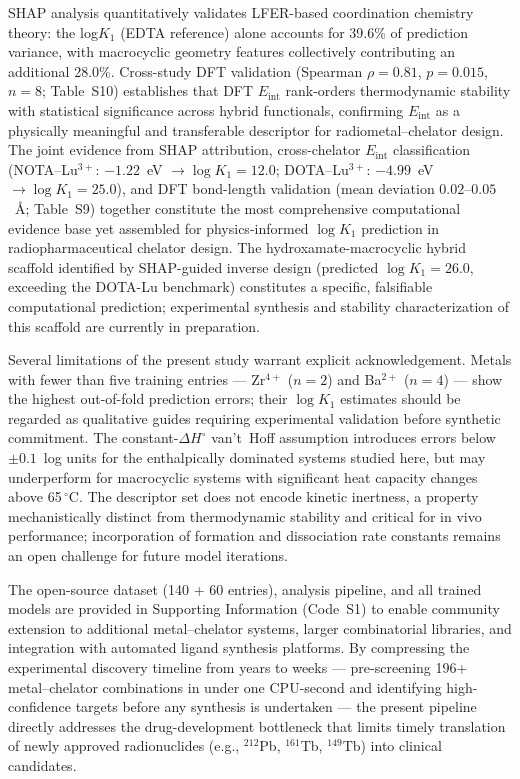 \documentclass[journal=jacsat,manuscript=article]{achemso}
\begin{document}
SHAP analysis quantitatively validates LFER-based coordination chemistry
theory:\cite{Hancock1989,MartellSmith2004} the log$K_1$ (EDTA reference) alone
accounts for 39.6\% of prediction variance, with macrocyclic geometry features
collectively contributing an additional 28.0\%.
Cross-study DFT validation (Spearman $\rho = 0.81$, $p = 0.015$, $n = 8$;
Table~S10)\cite{Kim2026molpharm} establishes that DFT $E_\mathrm{int}$
rank-orders thermodynamic stability with statistical significance across hybrid
functionals, confirming $E_\mathrm{int}$ as a physically meaningful and
transferable descriptor for radiometal--chelator design.
The joint evidence from SHAP attribution, cross-chelator $E_\mathrm{int}$
classification (NOTA--Lu$^{3+}$: $-1.22$~eV $\to \log K_1 = 12.0$;
DOTA--Lu$^{3+}$: $-4.99$~eV $\to \log K_1 = 25.0$), and DFT bond-length
validation (mean deviation $0.02$--$0.05$~\AA; Table~S9) together constitute the
most comprehensive computational evidence base yet assembled for physics-informed
$\log K_1$ prediction in radiopharmaceutical chelator design.
The hydroxamate-macrocyclic hybrid scaffold identified by SHAP-guided inverse
design (predicted $\log K_1 = 26.0$, exceeding the DOTA-Lu benchmark)
constitutes a specific, falsifiable computational prediction;
experimental synthesis and stability characterization of this scaffold
are currently in preparation.\cite{Hu2022,Morgan2023,Herrmann2020}

Several limitations of the present study warrant explicit acknowledgement.
Metals with fewer than five training entries --- Zr$^{4+}$ ($n = 2$) and
Ba$^{2+}$ ($n = 4$) --- show the highest out-of-fold prediction errors;
their $\log K_1$ estimates should be regarded as qualitative guides requiring
experimental validation before synthetic commitment.
The constant-$\Delta H^\circ$ van't~Hoff assumption introduces errors below
$\pm 0.1$~log units for the enthalpically dominated systems studied here,
but may underperform for macrocyclic systems with significant heat capacity
changes above 65\,$^\circ$C.\cite{Blei2023}
The descriptor set does not encode kinetic inertness, a property mechanistically
distinct from thermodynamic stability and critical for in vivo performance;
\cite{Notni2010,Wadas2010}
incorporation of formation and dissociation rate constants remains an open
challenge for future model iterations.

The open-source dataset (140 + 60 entries), analysis pipeline, and all trained models
are provided in Supporting Information (Code~S1) to enable community extension to
additional metal--chelator systems, larger combinatorial libraries, and integration
with automated ligand synthesis platforms.\cite{Karunaratne2025,Ozturk2024}
By compressing the experimental discovery timeline from years to weeks ---
pre-screening 196+ metal--chelator combinations in under one CPU-second and
identifying high-confidence targets before any synthesis is undertaken ---
the present pipeline directly addresses the drug-development bottleneck
that limits timely translation of newly approved radionuclides
(e.g., $^{212}$Pb, $^{161}$Tb, $^{149}$Tb) into clinical candidates.
\end{document}
